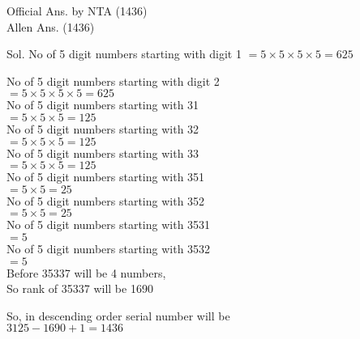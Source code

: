 \documentclass[10pt]{article}
\begin{document}
Official Ans. by NTA (1436)\\
Allen Ans. (1436)

Sol. No of 5 digit numbers starting with digit 1 \(=5 \times 5 \times 5 \times 5=625\)

No of 5 digit numbers starting with digit 2\\
\(=5 \times 5 \times 5 \times 5=625\)\\
No of 5 digit numbers starting with 31\\
\(=5 \times 5 \times 5=125\)\\
No of 5 digit numbers starting with 32\\
\(=5 \times 5 \times 5=125\)\\
No of 5 digit numbers starting with 33\\
\(=5 \times 5 \times 5=125\)\\
No of 5 digit numbers starting with 351\\
\(=5 \times 5=25\)\\
No of 5 digit numbers starting with 352\\
\(=5 \times 5=25\)\\
No of 5 digit numbers starting with 3531\\
\(=5\)\\
No of 5 digit numbers starting with 3532\\
\(=5\)\\
Before 35337 will be 4 numbers,\\
So rank of 35337 will be 1690

So, in descending order serial number will be\\
\(3125-1690+1=1436\)
\end{document}
